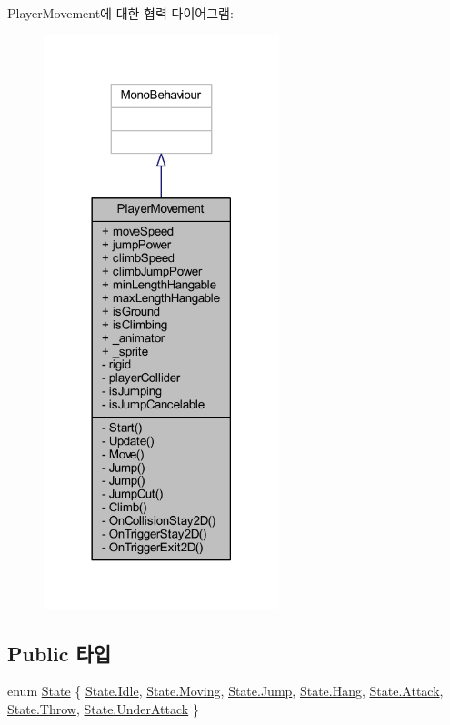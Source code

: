 Player\+Movement에 대한 협력 다이어그램\+:\nopagebreak
\begin{figure}[H]
\begin{center}
\leavevmode
\includegraphics[width=194pt]{d5/df4/class_player_movement__coll__graph}
\end{center}
\end{figure}
\subsection*{Public 타입}
\begin{DoxyCompactItemize}
\item 
enum \mbox{\hyperlink{class_player_movement_a0dc6677272370f08106ac49997853c6f}{State}} \{ \newline
\mbox{\hyperlink{class_player_movement_a0dc6677272370f08106ac49997853c6fae599161956d626eda4cb0a5ffb85271c}{State.\+Idle}}, 
\mbox{\hyperlink{class_player_movement_a0dc6677272370f08106ac49997853c6fadefe967ad0373b2274fc298f19125ca7}{State.\+Moving}}, 
\mbox{\hyperlink{class_player_movement_a0dc6677272370f08106ac49997853c6fa101f693f72287a2819a364f64ca1c0ed}{State.\+Jump}}, 
\mbox{\hyperlink{class_player_movement_a0dc6677272370f08106ac49997853c6faab2455e33b8ddb6a9d2d41107a2ed4f6}{State.\+Hang}}, 
\newline
\mbox{\hyperlink{class_player_movement_a0dc6677272370f08106ac49997853c6fadcfafcb4323b102c7e204555d313ba0a}{State.\+Attack}}, 
\mbox{\hyperlink{class_player_movement_a0dc6677272370f08106ac49997853c6fa8ce61dd2505effd96f937fa743b6491f}{State.\+Throw}}, 
\mbox{\hyperlink{class_player_movement_a0dc6677272370f08106ac49997853c6fa7f00296ed953c426cd7411d8a32eac49}{State.\+Under\+Attack}}
 \}
\end{DoxyCompactItemize}
